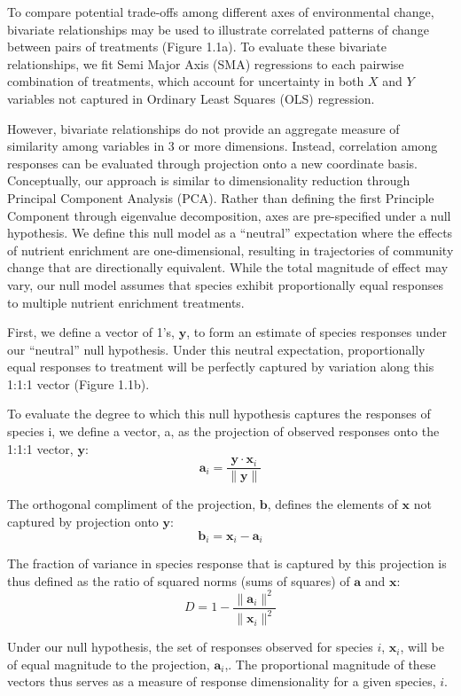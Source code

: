 \documentclass[twoside,12pt,final]{ucthesis-CA2012}
\begin{document}
\begin{ucmainmatter}
To compare potential trade-offs among different axes of environmental change, bivariate relationships may be used to illustrate correlated patterns of change between pairs of treatments (Figure 1.1a). To evaluate these bivariate relationships, we fit Semi Major Axis (SMA) regressions to each pairwise combination of treatments, which account for uncertainty in both \(X\) and \(Y\) variables not captured in Ordinary Least Squares (OLS) regression.

However, bivariate relationships do not provide an aggregate measure of similarity among variables in 3 or more dimensions. Instead, correlation among responses can be evaluated through projection onto a new coordinate basis. Conceptually, our approach is similar to dimensionality reduction through Principal Component Analysis (PCA). Rather than defining the first Principle Component through eigenvalue decomposition, axes are pre-specified under a null hypothesis. We define this null model as a ``neutral'' expectation where the effects of nutrient enrichment are one-dimensional, resulting in trajectories of community change that are directionally equivalent. While the total magnitude of effect may vary, our null model assumes that species exhibit proportionally equal responses to multiple nutrient enrichment treatments.

First, we define a vector of 1's, \(\mathbf{y}\), to form an estimate of species responses under our ``neutral'' null hypothesis. Under this neutral expectation, proportionally equal responses to treatment will be perfectly captured by variation along this 1:1:1 vector (Figure 1.1b).

To evaluate the degree to which this null hypothesis captures the responses of species i, we define a vector, a, as the projection of observed responses onto the 1:1:1 vector, \(\mathbf{y}\):
\[\mathbf{a}_i = \frac{\mathbf{y} \cdot \mathbf{x}_i}{\|\mathbf{y}\|}\]

The orthogonal compliment of the projection, \(\mathbf{b}\), defines the elements of \(\mathbf{x}\) not captured by projection onto \(\mathbf{y}\):
\[\mathbf{b}_i = \mathbf{x}_i - \mathbf{a}_i\]

The fraction of variance in species response that is captured by this projection is thus defined as the ratio of squared norms (sums of squares) of \(\mathbf{a}\) and \(\mathbf{x}\):
\[D = 1 - \frac{\|\mathbf{a}_i\|^2}{\|\mathbf{x}_i\|^2}\]

Under our null hypothesis, the set of responses observed for species \(i\), \(\mathbf{x}_i\), will be of equal magnitude to the projection, \(\mathbf{a}_i\),. The proportional magnitude of these vectors thus serves as a measure of response dimensionality for a given species, \(i\).


\end{ucmainmatter}
\end{document}
